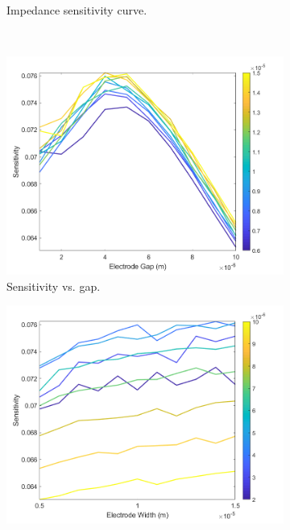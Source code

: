 \begin{figure}[h]
\begin{subfigure}[t]{0.49\textwidth}
        \caption{Impedance sensitivity curve.}
    \end{subfigure}
    \\
    \vspace{0.1 in}
    \begin{subfigure}[t]{0.49\textwidth}
        \centering
        \includegraphics[width=\textwidth]{images/comsol_simple_gapXsensitivity.png}
        \caption{Sensitivity vs. gap.}
    \end{subfigure}
    \hfill
    \begin{subfigure}[t]{0.49\textwidth}
        \centering
        \includegraphics[width=\textwidth]{images/comsol_simple_widthXsensitivity.png}

\end{subfigure}
\end{figure}
